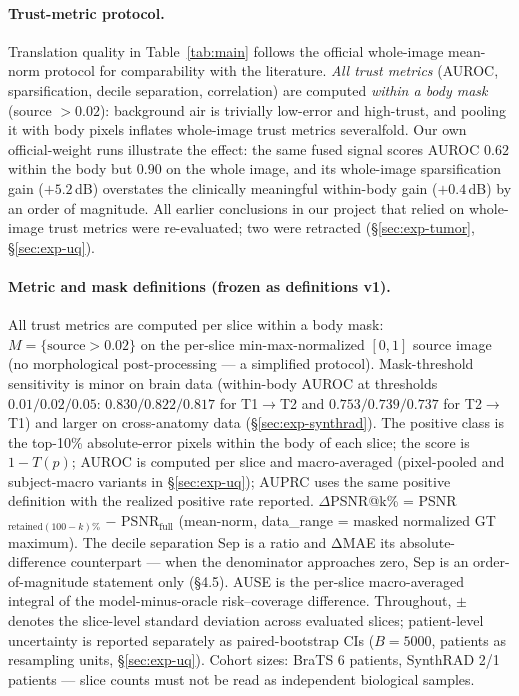 \documentclass[11pt]{article}
\begin{document}
\paragraph{Trust-metric protocol.}
Translation quality in Table~\ref{tab:main} follows the official whole-image
mean-norm protocol for comparability with the literature. \emph{All trust
metrics} (AUROC, sparsification, decile separation, correlation) are computed
\emph{within a body mask} (source $>0.02$): background air is trivially
low-error and high-trust, and pooling it with body pixels inflates
whole-image trust metrics severalfold. Our own official-weight runs
illustrate the effect: the same fused signal scores AUROC $0.62$ within the
body but $0.90$ on the whole image, and its whole-image sparsification gain
($+5.2$\,dB) overstates the clinically meaningful within-body gain
($+0.4$\,dB) by an order of magnitude. All earlier conclusions in our project
that relied on whole-image trust metrics were re-evaluated; two were retracted (\S\ref{sec:exp-tumor},
\S\ref{sec:exp-uq}).
\paragraph{Metric and mask definitions (frozen as definitions v1).}
All trust metrics are computed per slice within a body mask:
$M=\{\text{source}>0.02\}$ on the per-slice min-max-normalized $[0,1]$ source
image (no morphological post-processing --- a simplified protocol). Mask-threshold
sensitivity is minor on brain data (within-body AUROC at thresholds
$0.01/0.02/0.05$: $0.830/0.822/0.817$ for T1$\to$T2 and $0.753/0.739/0.737$
for T2$\to$T1) and larger on cross-anatomy data (\S\ref{sec:exp-synthrad}). The positive class is the
top-10\% absolute-error pixels within the body of each slice; the score is
$1-T(p)$; AUROC is computed per slice and macro-averaged (pixel-pooled and
subject-macro variants in \S\ref{sec:exp-uq}); AUPRC uses the same positive
definition with the realized positive rate reported. $\Delta$PSNR@k\% =
PSNR$_{\text{retained}(100-k)\%}$ $-$ PSNR$_{\text{full}}$ (mean-norm,
data\_range = masked normalized GT maximum). The decile separation Sep is a
ratio and ΔMAE its absolute-difference counterpart --- when the denominator
approaches zero, Sep is an order-of-magnitude statement only (\S4.5). AUSE is
the per-slice macro-averaged integral of the model-minus-oracle risk--coverage
difference. Throughout, $\pm$ denotes the slice-level standard deviation across
evaluated slices; patient-level uncertainty is reported separately as
paired-bootstrap CIs ($B{=}5000$, patients as resampling units,
\S\ref{sec:exp-uq}). Cohort sizes: BraTS 6 patients, SynthRAD 2/1 patients ---
slice counts must not be read as independent biological samples.
\end{document}
